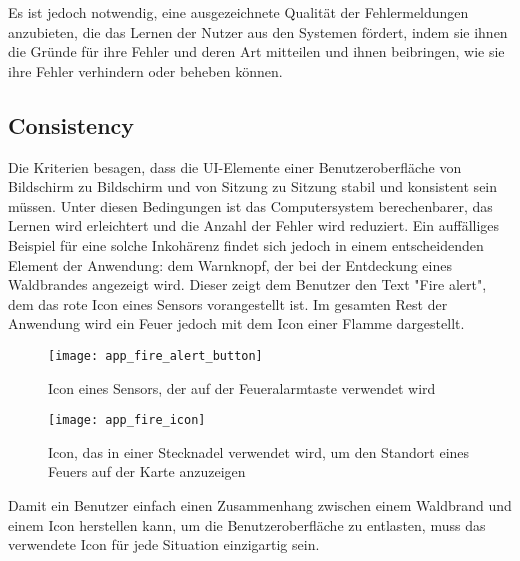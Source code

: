 Es ist jedoch notwendig, eine ausgezeichnete Qualität der Fehlermeldungen anzubieten, die das Lernen der Nutzer aus den Systemen fördert, indem sie ihnen die Gründe für ihre Fehler und deren Art mitteilen und ihnen beibringen, wie sie ihre Fehler verhindern oder beheben können.

\subsection{Consistency}

Die Kriterien besagen, dass die \ac{UI}-Elemente einer Benutzeroberfläche von Bildschirm zu Bildschirm und von Sitzung zu Sitzung stabil und konsistent sein müssen. Unter diesen Bedingungen ist das Computersystem berechenbarer, das Lernen wird erleichtert und die Anzahl der Fehler wird reduziert.
Ein auffälliges Beispiel für eine solche Inkohärenz findet sich jedoch in einem entscheidenden Element der Anwendung: dem Warnknopf, der bei der Entdeckung eines Waldbrandes angezeigt wird.
Dieser zeigt dem Benutzer den Text "Fire alert", dem das rote Icon eines Sensors vorangestellt ist.
Im gesamten Rest der Anwendung wird ein Feuer jedoch mit dem Icon einer Flamme dargestellt.

\begin{figure}[H]
  \centering
  \texttt{[image: app\_fire\_alert\_button]}
  \caption{Icon eines Sensors, der auf der Feueralarmtaste verwendet wird}
  \label{fig:app_fire_alert_button}
\end{figure}

\begin{figure}[H]
  \centering
  \texttt{[image: app\_fire\_icon]}
  \caption{Icon, das in einer Stecknadel verwendet wird, um den Standort eines Feuers auf der Karte anzuzeigen}
  \label{fig:app_fire_icon}
\end{figure}

Damit ein Benutzer einfach einen Zusammenhang zwischen einem Waldbrand und einem Icon herstellen kann, um die Benutzeroberfläche zu entlasten, muss das verwendete Icon für jede Situation einzigartig sein.\\

